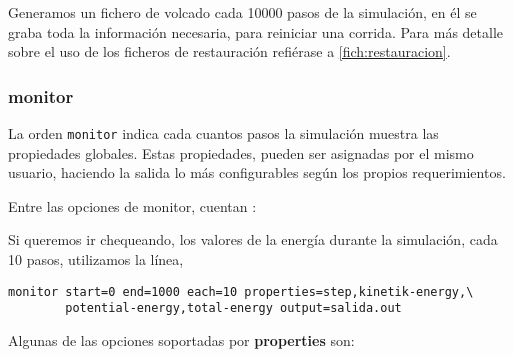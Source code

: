 
Generamos un fichero de volcado cada 10000 pasos de la simulaci\'on, en \'el se graba toda la informaci\'on necesaria, para reiniciar una corrida. Para m\'as detalle sobre el uso de los ficheros de restauraci\'on refi\'erase a \ref{fich:restauracion}.

\subsubsection{monitor}
La orden \verb|monitor| indica cada cuantos pasos la simulaci\'on muestra las propiedades globales. Estas propiedades, pueden ser asignadas por el mismo usuario, haciendo la salida lo m\'as configurables seg\'un los propios requerimientos.

Entre las opciones de monitor, cuentan :


Si queremos ir chequeando, los valores de la energ\'ia durante la simulaci\'on, cada 10 pasos, utilizamos la l\'inea,

\begin{verbatim}
monitor start=0 end=1000 each=10 properties=step,kinetik-energy,\
        potential-energy,total-energy output=salida.out
\end{verbatim}

Algunas de las opciones soportadas por \textbf{properties} son:

